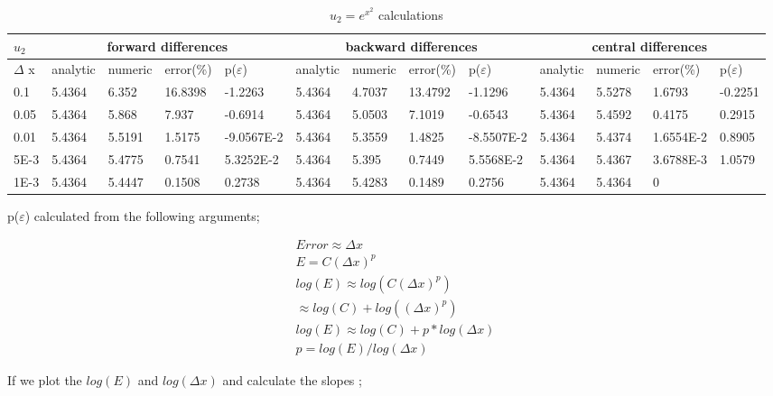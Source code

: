 \documentclass[paper=a4, fontsize=11pt]{scrartcl} %
\numberwithin{equation}{section} %
\numberwithin{figure}{section} %
\numberwithin{table}{section} %
\begin{document}
\begin{table}[ht]
\centering
\begin{adjustbox}{width=1\textwidth}
\small
\begin{tabular}{ | l | l | l | l | l | l | l | l | l | l | l | l | l |}
\hline
	$u_2$ & \multicolumn{4}{c|}{forward differences}  & \multicolumn{4}{c|}{backward differences} &  \multicolumn{4}{c|}{central differences}   \\ \hline
	$\Delta$ x & analytic & numeric & error(\%) & p($\varepsilon$) & analytic & numeric & error(\%) & p($\varepsilon$) & analytic & numeric & error(\%) & p($\varepsilon$) \\ \hline
	0.1 & 5.4364 & 6.352 & 16.8398 & -1.2263 & 5.4364 & 4.7037 & 13.4792 & -1.1296 & 5.4364 & 5.5278 & 1.6793 & -0.2251 \\ \hline
	0.05 & 5.4364 & 5.868 & 7.937 & -0.6914 & 5.4364 & 5.0503 & 7.1019 & -0.6543 & 5.4364 & 5.4592 & 0.4175 & 0.2915 \\ \hline
	0.01 & 5.4364 & 5.5191 & 1.5175 & -9.0567E-2 & 5.4364 & 5.3559 & 1.4825 & -8.5507E-2 & 5.4364 & 5.4374 & 1.6554E-2 & 0.8905 \\ \hline
	5E-3 & 5.4364 & 5.4775 & 0.7541 & 5.3252E-2 & 5.4364 & 5.395 & 0.7449 & 5.5568E-2 & 5.4364 & 5.4367 & 3.6788E-3 & 1.0579 \\ \hline
	1E-3 & 5.4364 & 5.4447 & 0.1508 & 0.2738 & 5.4364 & 5.4283 & 0.1489 & 0.2756 & 5.4364 & 5.4364 & 0 &  \\ \hline
\end{tabular}
\end{adjustbox}
\caption{$u_2 = e ^{ {x^ 2}} $ calculations} 
\end{table} 

p($\varepsilon$) calculated from the following arguments;

\begin{align}
Error \approx \Delta x \\
E=C(\Delta x)^p \\
log(E) \approx log(C(\Delta x)^p) \\
\approx log(C)+log((\Delta x)^p) \\
log(E) \approx log(C)+p*log(\Delta x) \\
p = log(E)/log(\Delta x)
\end{align}

If we plot the $ log(E)$ and $log(\Delta x) $ and calculate the slopes ;
\end{document}
